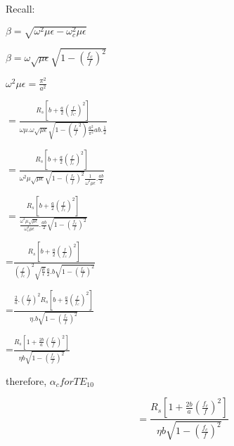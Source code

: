 Recall:
\begin{center}
	$\beta=\sqrt{\omega^2\mu\epsilon-\omega_c^2\mu\epsilon}$	
\end{center}

\begin{center}
	$\beta=\omega\sqrt{\mu\epsilon}\sqrt{1-(\frac{f_c}{f})^2}$	
\end{center}


\begin{center}
	$\omega^2\mu\epsilon=\frac{\pi^2}{a^2}$	
\end{center}

\begin{center}
	$=\frac{R_s[b+\frac{a}{2}(\frac{f}{f_C})^2]}{\omega\mu.\omega\sqrt{\mu\epsilon}\sqrt{1-(\frac{f_c}{f}^2)}\frac{a^2}{\pi^2}ab.\frac{1}{2}}$	
\end{center}

\begin{center}
	$=\frac{R_s[b+\frac{a}{2}(\frac{f}{f_c})^2]}{\omega^2\mu\sqrt{\mu\epsilon}\sqrt{1-(\frac{f_c}{f})^2}\frac{1}{\omega^2\mu\epsilon}.\frac{ab}{2}}$	
\end{center}

\begin{center}
	$=\frac{R_s[b+\frac{a}{2}(\frac{f}{f_c})^2]}{\frac{\omega^2\mu\sqrt{\mu\epsilon}}{\omega_c^2\mu\epsilon}.\frac{ab}{2}\sqrt{1-(\frac{f_c}{f})^2}}$	
\end{center}

\begin{center}
	=$\frac{R_s[b+\frac{a}{2}(\frac{f}{f_c})^2]}{(\frac{f}{f_c})^2\sqrt{\frac{\mu}{\epsilon}}\frac{a}{2}.b\sqrt{1-(\frac{f_c}{f})^2}}$	
\end{center}

\begin{center}
	=$\frac{\frac{2}{a}.(\frac{f_c}{f})^2R_s[b+\frac{a}{2}(\frac{f}{f_c})^2]}{\eta.b\sqrt{1-(\frac{f_c}{f})^2}}$	
\end{center}

\begin{center}
	=$\frac{R_s[1+\frac{2b}{a}(\frac{f_c}{f})^2]}{\eta b\sqrt{1-(\frac{f_c}{f})^2}}$	
\end{center}


therefore,
$\alpha_{c} for TE_{10}$

\begin{equation}
=\frac{R_s[1+\frac{2b}{a}(\frac{f_c}{f})^2]}{\eta b\sqrt{1-(\frac{f_c}{f})^2}}	
\end{equation}

